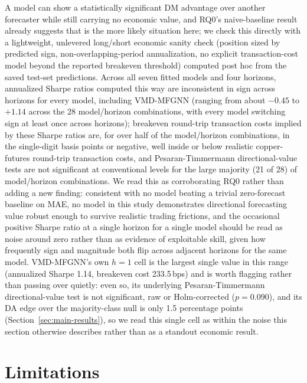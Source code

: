 \documentclass[journal]{IEEEtran}
\begin{document}
A model can show a statistically significant DM advantage over another forecaster while still carrying no economic value, and RQ0's naive-baseline result already suggests that is the more likely situation here; we check this directly with a lightweight, unlevered long/short economic sanity check (position sized by predicted sign, non-overlapping-period annualization, no explicit transaction-cost model beyond the reported breakeven threshold) computed post hoc from the saved test-set predictions. Across all seven fitted models and four horizons, annualized Sharpe ratios computed this way are inconsistent in sign across horizons for every model, including VMD-MFGNN (ranging from about $-0.45$ to $+1.14$ across the 28 model/horizon combinations, with every model switching sign at least once across horizons); breakeven round-trip transaction costs implied by these Sharpe ratios are, for over half of the model/horizon combinations, in the single-digit basis points or negative, well inside or below realistic copper-futures round-trip transaction costs, and Pesaran-Timmermann directional-value tests are not significant at conventional levels for the large majority (21 of 28) of model/horizon combinations. We read this as corroborating RQ0 rather than adding a new finding: consistent with no model beating a trivial zero-forecast baseline on MAE, no model in this study demonstrates directional forecasting value robust enough to survive realistic trading frictions, and the occasional positive Sharpe ratio at a single horizon for a single model should be read as noise around zero rather than as evidence of exploitable skill, given how frequently sign and magnitude both flip across adjacent horizons for the same model. VMD-MFGNN's own $h=1$ cell is the largest single value in this range (annualized Sharpe 1.14, breakeven cost 233.5\,bps) and is worth flagging rather than passing over quietly: even so, its underlying Pesaran-Timmermann directional-value test is not significant, raw or Holm-corrected ($p=0.090$), and its DA edge over the majority-class null is only 1.5 percentage points (Section~\ref{sec:main-results}), so we read this single cell as within the noise this section otherwise describes rather than as a standout economic result.

\FloatBarrier

\section{Limitations}
\label{sec:limitations}
\end{document}
